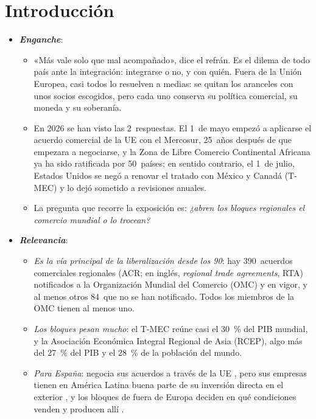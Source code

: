 \documentclass[11pt]{article}
\begin{document}
\tceetitulo

\section*{Introducción}

\begin{itemize}
\item \textbf{\emph{Enganche}}:
  \begin{itemize}
  \item «Más vale solo que mal acompañado», dice el refrán. Es el dilema de todo país ante la integración: integrarse o no, y con quién. Fuera de la Unión Europea, casi todos lo resuelven a medias: se quitan los aranceles con unos socios escogidos, pero cada uno conserva su política comercial, su moneda y su soberanía.
  \item En 2026 se han visto las 2~respuestas. El 1~de mayo empezó a aplicarse el acuerdo comercial de la UE con el Mercosur, 25~años después de que empezara a negociarse\nocite{CE2026MercosurProvisional}, y la Zona de Libre Comercio Continental Africana ya ha sido ratificada por 50~países\nocite{AfCFTA2026Consejo}; en sentido contrario, el 1~de julio, Estados Unidos se negó a renovar el tratado con México y Canadá (T-MEC) y lo dejó sometido a revisiones anuales\nocite{IISD2026TMEC}.
  \item La pregunta que recorre la exposición es: \emph{¿abren los bloques regionales el comercio mundial o lo trocean?}
  \end{itemize}

\item \textbf{\emph{Relevancia}}:
  \begin{itemize}
  \item \emph{Es la vía principal de la liberalización desde los 90}: hay 390~acuerdos comerciales regionales (ACR; en inglés, \emph{regional trade agreements}, RTA) notificados a la Organización Mundial del Comercio (OMC) y en vigor, y al menos otros 84~que no se han notificado\nocite{OMC2026RTAIS,OMC2026ComiteACR}. Todos los miembros de la OMC tienen al menos uno.
  \item \emph{Los bloques pesan mucho}: el T-MEC reúne casi el 30~\% del PIB mundial, y la Asociación Económica Integral Regional de Asia (RCEP), algo más del 27~\% del PIB y el 28~\% de la población del mundo\nocite{BM2026WDI}.
  \item \emph{Para España}: negocia sus acuerdos a través de la UE , pero sus empresas tienen en América Latina buena parte de su inversión directa en el exterior , y los bloques de fuera de Europa deciden en qué condiciones venden y producen allí .
  \end{itemize}


\end{itemize}
\end{document}
